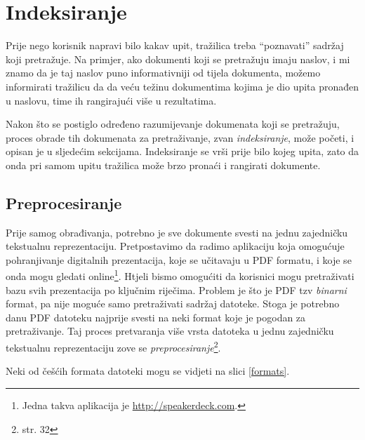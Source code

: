 \documentclass[a4paper,twoside,12pt]{scrreprt}
\begin{document}
\section{Indeksiranje}
\label{indexing}


Prije nego korisnik napravi bilo kakav upit, tražilica treba ``poznavati'' sadržaj koji pretražuje. Na primjer, ako dokumenti koji se pretražuju imaju naslov, i mi znamo da je taj naslov puno informativniji od tijela dokumenta, možemo informirati tražilicu da da veću težinu dokumentima kojima je dio upita pronađen u naslovu, time ih rangirajući više u rezultatima.

Nakon što se postiglo određeno razumijevanje dokumenata koji se pretražuju, proces obrade tih dokumenata za pretraživanje, zvan \textit{indeksiranje}, može početi, i opisan je u sljedećim sekcijama. Indeksiranje se vrši prije bilo kojeg upita, zato da onda pri samom upitu tražilica može brzo pronaći i rangirati dokumente.

\subsection{Preprocesiranje}

Prije samog obrađivanja, potrebno je sve dokumente svesti na jednu zajedničku tekstualnu reprezentaciju. Pretpostavimo da radimo aplikaciju koja omogućuje pohranjivanje digitalnih prezentacija, koje se učitavaju u PDF formatu, i koje se onda mogu gledati online\footnote{Jedna takva aplikacija je \url{http://speakerdeck.com}.}. Htjeli bismo omogućiti da korisnici mogu pretraživati bazu svih prezentacija po ključnim riječima. Problem je što je PDF tzv \textit{binarni} format, pa nije moguće samo pretraživati sadržaj datoteke. Stoga je potrebno danu PDF datoteku najprije svesti na neki format koje je pogodan za pretraživanje. Taj proces pretvaranja više vrsta datoteka u jednu zajedničku tekstualnu reprezentaciju zove se \textit{preprocesiranje}\footnote{\cite{taming} str. 32}.

Neki od češćih formata datoteki mogu se vidjeti na slici \ref{formats}.
\end{document}
